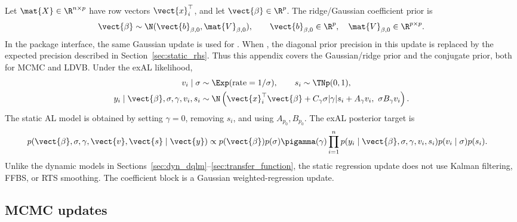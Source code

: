 Let $\mat{X}\in\R^{n\times p}$ have row vectors $\vect{x}_i^\top$, and let
$\vect{\beta}\in\R^p$. The ridge/Gaussian coefficient prior is
\begin{equation}
\vect{\beta}\sim\N(\vect{b}_{\beta,0},\mat{V}_{\beta,0}),\qquad
\vect{b}_{\beta,0}\in\R^p,\quad \mat{V}_{\beta,0}\in\R^{p\times p}.
\label{eq:static_beta_ridge}
\end{equation}
In the package interface, the same Gaussian update is used for
. When , the diagonal
prior precision in this update is replaced by the  expected precision
described in Section~\ref{sec:static_rhs}. Thus this appendix covers the
Gaussian/ridge prior and the conjugate  prior, both for MCMC and LDVB.
Under the exAL likelihood,
\begin{align}
v_i\mid\sigma &\sim \Exp(\text{rate}=1/\sigma),\qquad
s_i\sim\TNp(0,1),\\
y_i\mid\vect{\beta},\sigma,\gamma,v_i,s_i
&\sim
\N\left(
\vect{x}_i^\top\vect{\beta}+C_\gamma\sigma|\gamma|s_i+A_\gamma v_i,\
\sigma B_\gamma v_i
\right).
\label{eq:static_exal_hierarchy}
\end{align}
The static AL model is obtained by setting $\gamma=0$, removing $s_i$, and
using $A_{p_0},B_{p_0}$. The exAL posterior target is
\begin{align}
p(\vect{\beta},\sigma,\gamma,\vect{v},\vect{s}\mid\vect{y})
&\propto
p(\vect{\beta})p(\sigma)\pigamma(\gamma)
\prod_{i=1}^n
p(y_i\mid\vect{\beta},\sigma,\gamma,v_i,s_i)
p(v_i\mid\sigma)p(s_i).
\label{eq:static_exal_target}
\end{align}
Unlike the dynamic models in Sections~\ref{sec:dyn_dqlm}--\ref{sec:transfer_function},
the static regression update does not use Kalman filtering, FFBS, or RTS
smoothing. The coefficient block is a Gaussian weighted-regression update.

\subsection{MCMC updates}

